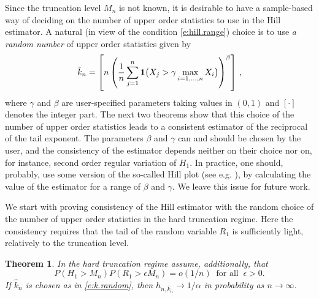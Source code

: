 \documentclass[11pt]{amsart}
\newtheorem{theorem}{Theorem}[section]
\numberwithin{equation}{section}
\begin{document}
Since the truncation level $M_n$ is not known, it is desirable to have
a sample-based way of deciding on the number of upper order statistics
to use in the Hill estimator. A natural (in view of the condition
\eqref{e:hill.range}) choice is to use {\it a random number} of upper
order statistics given by
\begin{equation} \label{e:k.random}
{\hat k}_n = \left[n\left( \frac1n \sum_{j=1}^n {{\bf 1}}\bigl(
  X_j>\gamma\max_{i=1,\ldots, n} X_i\bigr)\right)^\beta\right]\,,
\end{equation}
where $\gamma$ and $\beta$ are user-specified parameters taking values
in $(0,1)$ and $[\cdot]$ denotes the integer part. The  next two
theorems show that this choice 
of the number of upper order statistics leads to a consistent
estimator of the reciprocal of the tail exponent. The parameters
$\beta$ and $\gamma$ can and should be chosen by the user, and the
consistency of the estimator depends neither on their choice nor on,
for instance, second order regular variation of $H_1$. In practice,
one should, probably, use some version of the so-called Hill plot (see
e.g. \cite{embrechts:kluppelberg:mikosch:1997}), by
calculating the value of the estimator for a range of $\beta$ and
$\gamma$. We leave this issue for future work. 

We start with proving consistency of the Hill estimator with the
random choice of the number of upper order statistics in the
hard truncation regime. Here the consistency requires that the tail
of the random variable $R_1$ is sufficiently light, relatively to the
truncation level. 

\begin{theorem}\label{hill.t5}
In the hard truncation regime assume, additionally, that 
\begin{equation}\label{assume1}
P(H_1>M_n)P(R_1>\epsilon M_n)=o(1/n)\ \mbox{ for all }\ \epsilon>0.
\end{equation}
If $\hat k_n$ is chosen as in \eqref{e:k.random}, then $h_{n,\hat k_n}
\to 1/\alpha$ in probability as $n\to\infty$. 
\end{theorem}
\end{document}
